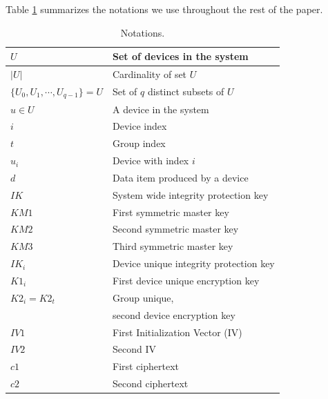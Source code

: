 {Table \ref{tab:notations} summarizes the notations we use throughout the rest of the paper.

\begin{table}[th]
\caption{Notations.}
\label{tab:notations}
\begin{tabular}{||l|l||} \hline
$U$ & Set of devices in the system \\ \hline
$|U|$ & Cardinality of set $U$ \\ \hline
$\{U_0, U_1,\cdots, U_{q-1}\} = U$ & Set of $q$ distinct subsets of $U$ \\ \hline
$u \in U$ & A device in the system \\ \hline
$i$ & Device index \\ \hline
$t$ & Group index \\ \hline
$u_i$ & Device with index $i$ \\ \hline
$d$ & Data item produced by a device \\ \hline
$IK$ &  System wide integrity protection key \\ \hline
$KM1$ & First symmetric master key \\ \hline
$KM2$ & Second symmetric master key \\ \hline
$KM3$ & Third symmetric master key \\ \hline
$IK_i$ & Device unique integrity protection key \\ \hline
$K1_i$ & First device unique encryption key \\ \hline
$K2_i = K2_t$ & Group unique, \\
& second device encryption key \\ \hline
$IV1$  & First Initialization Vector (IV) \\ \hline
$IV2$ & Second IV \\ \hline
$c1$ & First ciphertext \\  \hline
$c2$ & Second ciphertext \\ \hline

\end{tabular}
\end{table}}
